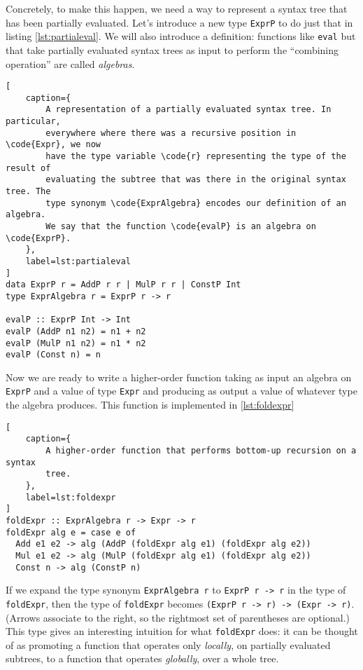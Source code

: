 \documentclass[letterpaper,11pt]{article}
\newcommand{\code}{\texttt}
\begin{document}
Concretely, to make this happen, we need a way to represent a syntax tree that
has been partially evaluated. Let's introduce a new type \code{ExprP} to do
just that in listing \ref{lst:partialeval}. We will also introduce a
definition: functions like \code{eval} but that take partially evaluated
syntax trees as input to perform the ``combining operation'' are called
\emph{algebras}.

\begin{lstlisting}[
    caption={
        A representation of a partially evaluated syntax tree. In particular,
        everywhere where there was a recursive position in \code{Expr}, we now
        have the type variable \code{r} representing the type of the result of
        evaluating the subtree that was there in the original syntax tree. The
        type synonym \code{ExprAlgebra} encodes our definition of an algebra.
        We say that the function \code{evalP} is an algebra on \code{ExprP}.
    },
    label=lst:partialeval
]
data ExprP r = AddP r r | MulP r r | ConstP Int
type ExprAlgebra r = ExprP r -> r

evalP :: ExprP Int -> Int
evalP (AddP n1 n2) = n1 + n2
evalP (MulP n1 n2) = n1 * n2
evalP (Const n) = n
\end{lstlisting}

Now we are ready to write a higher-order function taking as input an algebra on
\code{ExprP} and a value of type \code{Expr} and producing as output a value of
whatever type the algebra produces. This function is implemented in
\ref{lst:foldexpr}

\begin{lstlisting}[
    caption={
        A higher-order function that performs bottom-up recursion on a syntax
        tree.
    },
    label=lst:foldexpr
]
foldExpr :: ExprAlgebra r -> Expr -> r
foldExpr alg e = case e of
  Add e1 e2 -> alg (AddP (foldExpr alg e1) (foldExpr alg e2))
  Mul e1 e2 -> alg (MulP (foldExpr alg e1) (foldExpr alg e2))
  Const n -> alg (ConstP n)
\end{lstlisting}

If we expand the type synonym \code{ExprAlgebra r} to \code{ExprP r -> r} in
the type of \code{foldExpr}, then the type of \code{foldExpr} becomes
\code{(ExprP r -> r) -> (Expr -> r)}. (Arrows associate to the right, so the
rightmost set of parentheses are optional.) This type gives an interesting
intuition for what \code{foldExpr} does: it can be thought of as promoting a
function that operates only \emph{locally}, on partially evaluated subtrees, to
a function that operates \emph{globally}, over a whole tree.
\end{document}
